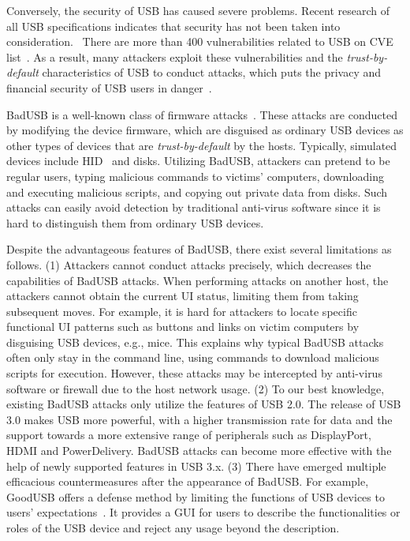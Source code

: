 \documentclass[conference]{IEEEtran}
\newcommand{\shuqing}[1]{}
\begin{document}
Conversely, the security of \ac{USB} has caused severe problems.
Recent research of all USB specifications indicates that security has not been taken into consideration.~\cite{sok}  There are more than 400
vulnerabilities related to \ac{USB} on CVE list~\cite{website:CVE-list}.  As a
result, many attackers exploit these vulnerabilities and the
\textit{trust-by-default} characteristics of \ac{USB} to conduct attacks, which puts
the privacy and financial security of \ac{USB} users in danger~\cite{sok}.

BadUSB is a well-known class of firmware attacks~\cite{badusb}.  These attacks
are conducted by modifying the device firmware, which are disguised
 as ordinary \ac{USB} devices as other types of devices that are \textit{trust-by-default}
by the hosts.  Typically, simulated devices include \ac{HID}~\cite{hid} and disks.  Utilizing BadUSB,
attackers can pretend to be regular users, typing malicious commands to
victims' computers, downloading and executing malicious scripts, and copying out
private data from disks.  Such attacks can easily avoid detection by traditional
anti-virus software since it is hard to distinguish them from ordinary \ac{USB}
devices.

Despite the advantageous features of BadUSB, there exist several limitations as
follows.  (1) Attackers cannot conduct attacks precisely, which decreases the
capabilities of BadUSB attacks.  When performing attacks on another host, the
attackers cannot obtain the current \ac{UI} status, limiting
them from taking subsequent moves.  For example, it is hard for attackers to
locate specific functional \ac{UI} patterns such as buttons and links on victim
computers by disguising \ac{USB} devices, e.g., mice.  This explains why typical
BadUSB attacks often only stay in the command line, using commands to download
malicious scripts for execution.  However, these attacks may be intercepted by
anti-virus software or firewall due to the host network usage.  (2) To
our best knowledge, existing BadUSB attacks only utilize the features of \ac{USB}
2.0.  The release of \ac{USB} 3.0 makes \ac{USB} more powerful, with a higher
transmission rate for data and the support towards a more extensive range of
peripherals such as DisplayPort, HDMI and PowerDelivery.  BadUSB attacks
can become more effective with the help of newly supported features in \ac{USB} 3.x.
(3) There have emerged multiple efficacious countermeasures after the
appearance of BadUSB.  For example, GoodUSB offers a defense method by limiting
the functions of \ac{USB} devices to users' expectations~\cite{tian2015defending}.
It provides a \ac{GUI} for users to describe the functionalities or
roles of the \ac{USB} device and reject any usage beyond the description.
\end{document}
